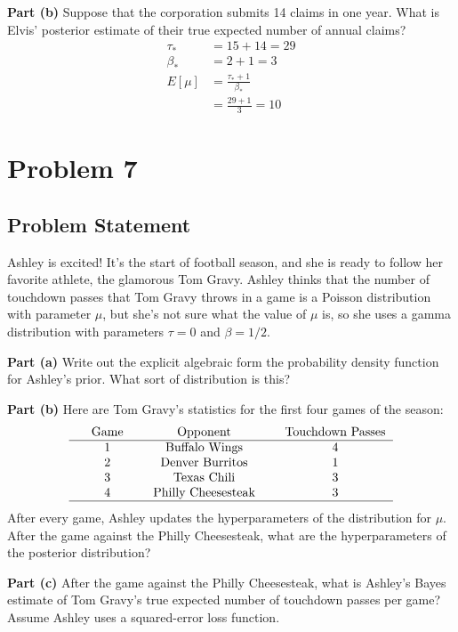 \documentclass[12pt]{article}
\theoremstyle{definition}
\begin{document}
\noindent
{\bf Part (b)} Suppose that the corporation submits 14 claims in one year. What is Elvis' posterior estimate of their true expected number of annual claims?
\begin{align*}
\tau_* &= 15 + 14 = 29\\
\beta_* &= 2 + 1 = 3\\
E[\mu] &= \frac{\tau_* + 1}{\beta_*}\\
&= \frac{29 + 1}{3} = 10
\end{align*}

\newpage
\section*{Problem 7}

\subsection*{Problem Statement}

Ashley is excited! It's the start of football season, and she is ready to follow her favorite athlete, the glamorous Tom Gravy. Ashley thinks that the number of touchdown passes that Tom Gravy throws in a game is a Poisson distribution with parameter $\mu$, but she's not sure what the value of $\mu$ is, so she uses a gamma distribution with parameters $\tau = 0$ and $\beta = 1/2$.

\bigskip
\noindent
{\bf Part (a)} Write out the explicit algebraic form the probability density function for Ashley's prior. What sort of distribution is this?

\bigskip
\noindent
{\bf Part (b)} Here are Tom Gravy's statistics for the first four games of the season:
$$
\begin{tabular}{ccccccc}
& Game & & Opponent & & Touchdown Passes\\
\hline
& 1 & & Buffalo Wings & & 4\\
& 2 & & Denver Burritos & & 1\\
& 3 & & Texas Chili & & 3\\
& 4 & & Philly Cheesesteak & & 3\\
\hline
\end{tabular}
$$
After every game, Ashley updates the hyperparameters of the distribution for $\mu$. After the game against the Philly Cheesesteak, what are the hyperparameters of the posterior distribution?

\bigskip
\noindent
{\bf Part (c)} After the game against the Philly Cheesesteak, what is Ashley's Bayes estimate of Tom Gravy's true expected number of touchdown passes per game? Assume Ashley uses a squared-error loss function.
\end{document}
